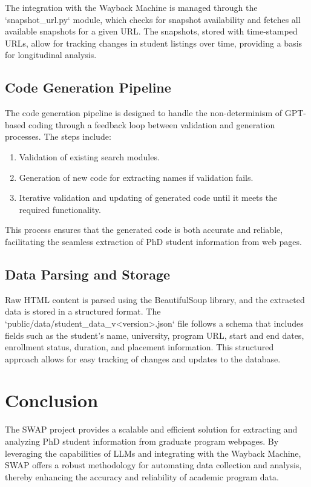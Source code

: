 \documentclass[11pt]{article}
\begin{document}
The integration with the Wayback Machine is managed through the `snapshot_url.py` module, which checks for snapshot availability and fetches all available snapshots for a given URL. The snapshots, stored with time-stamped URLs, allow for tracking changes in student listings over time, providing a basis for longitudinal analysis.

\subsection{Code Generation Pipeline}

The code generation pipeline is designed to handle the non-determinism of GPT-based coding through a feedback loop between validation and generation processes. The steps include:
\begin{enumerate}
    \item Validation of existing search modules.
    \item Generation of new code for extracting names if validation fails.
    \item Iterative validation and updating of generated code until it meets the required functionality.
\end{enumerate}

This process ensures that the generated code is both accurate and reliable, facilitating the seamless extraction of PhD student information from web pages.

\subsection{Data Parsing and Storage}

Raw HTML content is parsed using the BeautifulSoup library, and the extracted data is stored in a structured format. The `public/data/student_data_v<version>.json` file follows a schema that includes fields such as the student's name, university, program URL, start and end dates, enrollment status, duration, and placement information. This structured approach allows for easy tracking of changes and updates to the database.

\section{Conclusion}

The SWAP project provides a scalable and efficient solution for extracting and analyzing PhD student information from graduate program webpages. By leveraging the capabilities of LLMs and integrating with the Wayback Machine, SWAP offers a robust methodology for automating data collection and analysis, thereby enhancing the accuracy and reliability of academic program data.
\end{document}
